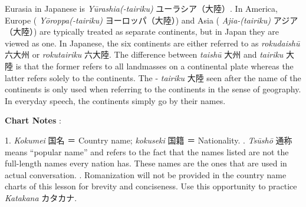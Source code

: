 \par{ Eurasia in Japanese is \emph{Yūrashia(-tairiku) }ユーラシア（大陸）. In America, Europe ( \emph{Yōroppa(-tairiku) }ヨーロッパ（大陸）) and Asia ( \emph{Ajia-(tairiku) }アジア（大陸）) are typically treated as separate continents, but in Japan they are viewed as one. In Japanese, the six continents are either referred to as \emph{rokudaishū }六大州 or \emph{rokutairiku }六大陸. The difference between \emph{taishū }大州 and \emph{tairiku }大陸 is that the former refers to all landmasses on a continental plate whereas the latter refers solely to the continents. The - \emph{tairiku }大陸 seen after the name of the continents is only used when referring to the continents in the sense of geography. In everyday speech, the continents simply go by their names. }

\par{\textbf{Chart Notes }: }

\par{1. \emph{Kokumei }国名 ＝ Country name; \emph{kokuseki }国籍 ＝ Nationality. \hfill{}. \emph{Tsūshō }通称 means “popular name” and refers to the fact that the names listed are not the full-length names every nation has. These names are the ones that are used in actual conversation. \hfill{}. Romanization will not be provided in the country name charts of this lesson for brevity and conciseness. Use this opportunity to practice \emph{Katakana }カタカナ. }

